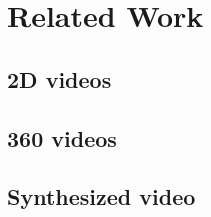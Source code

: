 \section{Related Work} \label{sec:related}

\subsection{2D videos}

\subsection{360 videos}

\subsection{Synthesized video}
